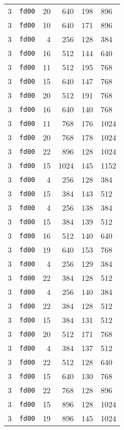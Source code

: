 \documentclass{article}
\begin{document}
\begin{table}[h!]
\begin{tabular}{llrrrl}
    3 & \texttt{fd00} & 20 & 640 & 198 & 896 \\
    3 & \texttt{fd00} & 10 & 640 & 171 & 896 \\
    3 & \texttt{fd00} & 4 & 256 & 128 & 384 \\
    3 & \texttt{fd00} & 16 & 512 & 144 & 640 \\
    3 & \texttt{fd00} & 11 & 512 & 195 & 768 \\
    3 & \texttt{fd00} & 15 & 640 & 147 & 768 \\
    3 & \texttt{fd00} & 20 & 512 & 191 & 768 \\
    3 & \texttt{fd00} & 16 & 640 & 140 & 768 \\
    3 & \texttt{fd00} & 11 & 768 & 176 & 1024 \\
    3 & \texttt{fd00} & 20 & 768 & 178 & 1024 \\
    3 & \texttt{fd00} & 22 & 896 & 128 & 1024 \\
    3 & \texttt{fd00} & 15 & 1024 & 145 & 1152 \\
    3 & \texttt{fd00} & 4 & 256 & 128 & 384 \\
    3 & \texttt{fd00} & 15 & 384 & 143 & 512 \\
    3 & \texttt{fd00} & 4 & 256 & 138 & 384 \\
    3 & \texttt{fd00} & 15 & 384 & 139 & 512 \\
    3 & \texttt{fd00} & 16 & 512 & 140 & 640 \\
    3 & \texttt{fd00} & 19 & 640 & 153 & 768 \\
    3 & \texttt{fd00} & 4 & 256 & 129 & 384 \\
    3 & \texttt{fd00} & 22 & 384 & 128 & 512 \\
    3 & \texttt{fd00} & 4 & 256 & 140 & 384 \\
    3 & \texttt{fd00} & 22 & 384 & 128 & 512 \\
    3 & \texttt{fd00} & 15 & 384 & 131 & 512 \\
    3 & \texttt{fd00} & 20 & 512 & 171 & 768 \\
    3 & \texttt{fd00} & 4 & 384 & 137 & 512 \\
    3 & \texttt{fd00} & 22 & 512 & 128 & 640 \\
    3 & \texttt{fd00} & 15 & 640 & 130 & 768 \\
    3 & \texttt{fd00} & 22 & 768 & 128 & 896 \\
    3 & \texttt{fd00} & 15 & 896 & 128 & 1024 \\
    3 & \texttt{fd00} & 19 & 896 & 145 & 1024 \\

\end{tabular}
\end{table}
\end{document}
